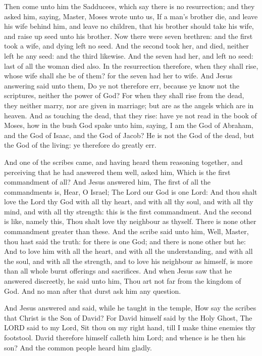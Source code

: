  Then come unto him the Sadducees, which say there is no
resurrection; and they asked him, saying,  Master, Moses
wrote unto us, If a man's brother die, and leave his wife behind him,
and leave no children, that his brother should take his wife, and raise
up seed unto his brother.  Now there were seven brethren:
and the first took a wife, and dying left no seed.  And the
second took her, and died, neither left he any seed: and the third
likewise.  And the seven had her, and left no seed: last of
all the woman died also.  In the resurrection therefore,
when they shall rise, whose wife shall she be of them? for the seven had
her to wife.  And Jesus answering said unto them, Do ye not
therefore err, because ye know not the scriptures, neither the power of
God?  For when they shall rise from the dead, they neither
marry, nor are given in marriage; but are as the angels which are in
heaven.  And as touching the dead, that they rise: have ye
not read in the book of Moses, how in the bush God spake unto him,
saying, I am the God of Abraham, and the God of Isaac, and the God of
Jacob?  He is not the God of the dead, but the God of the
living: ye therefore do greatly err.

 And one of the scribes came, and having heard them
reasoning together, and perceiving that he had answered them well, asked
him, Which is the first commandment of all?  And Jesus
answered him, The first of all the commandments is, Hear, O Israel; The
Lord our God is one Lord:  And thou shalt love the Lord thy
God with all thy heart, and with all thy soul, and with all thy mind,
and with all thy strength: this is the first commandment. 
And the second is like, namely this, Thou shalt love thy neighbour as
thyself. There is none other commandment greater than these.
 And the scribe said unto him, Well, Master, thou hast said
the truth: for there is one God; and there is none other but he:
 And to love him with all the heart, and with all the
understanding, and with all the soul, and with all the strength, and to
love his neighbour as himself, is more than all whole burnt offerings
and sacrifices.  And when Jesus saw that he answered
discreetly, he said unto him, Thou art not far from the kingdom of God.
And no man after that durst ask him any question.

 And Jesus answered and said, while he taught in the
temple, How say the scribes that Christ is the Son of David?
 For David himself said by the Holy Ghost, The LORD said to
my Lord, Sit thou on my right hand, till I make thine enemies thy
footstool.  David therefore himself calleth him Lord; and
whence is he then his son? And the common people heard him gladly.

